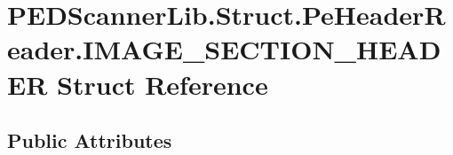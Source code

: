 \hypertarget{struct_p_e_d_scanner_lib_1_1_struct_1_1_pe_header_reader_1_1_i_m_a_g_e___s_e_c_t_i_o_n___h_e_a_d_e_r}{}\section{P\+E\+D\+Scanner\+Lib.\+Struct.\+Pe\+Header\+Reader.\+I\+M\+A\+G\+E\+\_\+\+S\+E\+C\+T\+I\+O\+N\+\_\+\+H\+E\+A\+D\+ER Struct Reference}
\label{struct_p_e_d_scanner_lib_1_1_struct_1_1_pe_header_reader_1_1_i_m_a_g_e___s_e_c_t_i_o_n___h_e_a_d_e_r}
\subsection*{Public Attributes}
